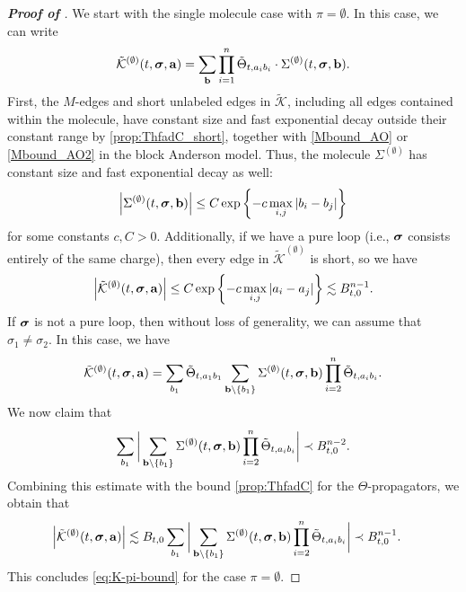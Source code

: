 \begin{proof}[\bf Proof of ]
We start with the single molecule case with $\pi=\emptyset$. In this case, we can write 
\begin{equation*}
    \tilde{\mathcal{K}}^{(\emptyset)}(t, {\boldsymbol{\sigma}}, \mathbf{a}) = \sum_{\mathbf{b}} \prod_{i=1}^n \tilde{\Theta}_{t,a_i b_i} \cdot \Sigma^{(\emptyset)}(t, {\boldsymbol{\sigma}}, \mathbf{b}).
\end{equation*}
First, the $M$-edges and short unlabeled edges in $\tilde{\mathcal{K}}$, including all edges contained within the molecule,
have constant size and fast exponential decay outside their constant range by \eqref{prop:ThfadC_short}, together with \eqref{Mbound_AO} or \eqref{Mbound_AO2} in the block Anderson model. Thus, the molecule $\Sigma^{(\emptyset)}$ has constant size and fast exponential decay as well:
\begin{equation}\label{eq:molecule-decay}
    \left|\Sigma^{(\emptyset)}(t, {\boldsymbol{\sigma}}, \mathbf{b})\right| \le C\exp\left\{-c\max_{i,j} |b_i-b_j|\right\}
\end{equation}
for some constants $c,C>0$. Additionally, if we have a pure loop (i.e., ${\boldsymbol{\sigma}}$ consists entirely of the same charge), then every edge in $\tilde{\mathcal{K}}^{(\emptyset)}$ is short, so we have 
\begin{equation*}
    \left|\tilde{\mathcal{K}}^{(\emptyset)}(t, {\boldsymbol{\sigma}}, \mathbf{a})\right| \le C\exp\left\{-c\max_{i,j} |a_i-a_j|\right\} \lesssim B_{t,0}^{n-1}.
\end{equation*}
If ${\boldsymbol{\sigma}}$ is not a pure loop, then without loss of generality, we can assume that $\sigma_1 \neq \sigma_2$. In this case, we have 
\begin{equation*}
    \tilde{\mathcal{K}}^{(\emptyset)}(t, {\boldsymbol{\sigma}}, \mathbf{a}) = \sum_{b_1} \tilde{\Theta}_{t,a_1b_1} \sum_{\mathbf{b}\setminus \{b_1\}} \Sigma^{(\emptyset)}(t, {\boldsymbol{\sigma}}, \mathbf{b}) \prod_{i=2}^n  \tilde{\Theta}_{t,a_i b_i}.
\end{equation*}
We now claim that 
\begin{equation}\label{eq:ind-step-bound}
    \sum_{b_1} \bigg|\sum_{\mathbf{b}\setminus \{b_1\}} \Sigma^{(\emptyset)}(t, {\boldsymbol{\sigma}}, \mathbf{b}) \prod_{i=2}^n \tilde{\Theta}_{t,a_i b_i}\bigg| \prec B_{t,0}^{n-2}.
\end{equation}
Combining this estimate with the bound \eqref{prop:ThfadC} for the $\Theta$-propagators, we obtain that 
\begin{align*}
    \left|\tilde{\mathcal{K}}^{(\emptyset)}(t, \bsig, \mathbf{a})\right| %
    &\lesssim B_{t,0}\sum_{b_1} \bigg|\sum_{\mathbf{b}\setminus \{b_1\}} \Sigma^{(\emptyset)}(t, \bsig, \mathbf{b}) \prod_{i=2}^n \tilde{\Theta}_{t,a_i b_i}\bigg| \prec B_{t,0}^{n-1}.
\end{align*}
This concludes \eqref{eq:K-pi-bound} for the case $\pi=\emptyset$.



\end{proof}
